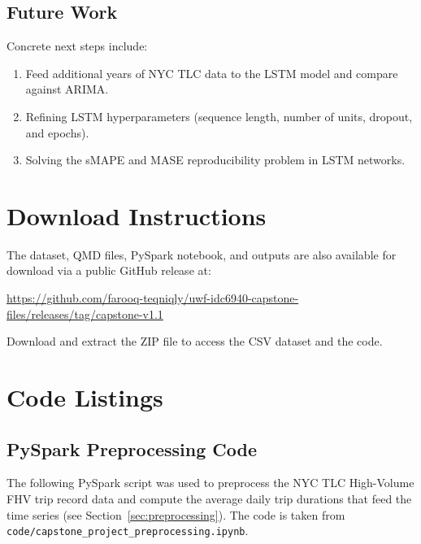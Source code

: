 \documentclass[12pt, a4paper]{article}
\begin{document}
\subsection{Future Work}

Concrete next steps include: 

\begin{enumerate}
\item Feed additional years of NYC TLC data to the LSTM model and compare against ARIMA.
\item Refining LSTM hyperparameters (sequence length, number of units, dropout, and epochs).
\item Solving the sMAPE and MASE reproducibility problem in LSTM networks. 
\end{enumerate}

\appendix

\section{Download Instructions}
\label{sec:downloads}

The dataset, QMD files, PySpark notebook, and outputs are also available for download via a public GitHub release at:
\begin{flushleft}
\url{https://github.com/farooq-teqniqly/uwf-idc6940-capstone-files/releases/tag/capstone-v1.1}
\end{flushleft}

Download and extract the ZIP file to access the CSV dataset and the code.

\section{Code Listings}\label{appendix:code_listings}

\subsection{PySpark Preprocessing Code}\label{appendix:pyspark}

The following PySpark script was used to preprocess the NYC TLC High-Volume FHV trip record data and compute the average daily trip durations that feed the time series (see Section~\ref{sec:preprocessing}). The code is taken from \texttt{code/capstone\_project\_preprocessing.ipynb}.
\end{document}
